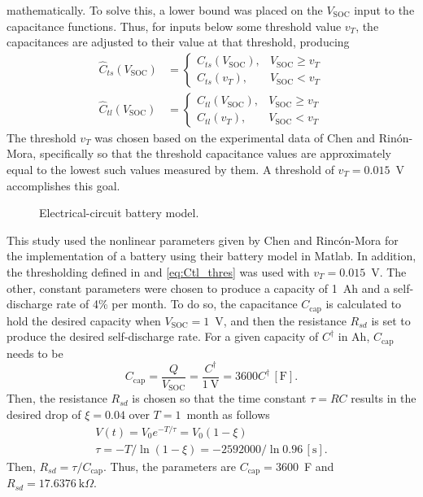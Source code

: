 \documentclass[../zhang_thesis.tex]{subfiles}
\begin{document}
mathematically. To solve this, a lower bound was placed on the $V_\text{SOC}$ input to the capacitance functions. Thus, for inputs below some threshold value $v_T$, the capacitances are adjusted to their value at that threshold, producing
\begin{align}
    \hat{C}_{ts}(V_\text{SOC}) &= \begin{cases}
        C_{ts}(V_\text{SOC}), & V_\text{SOC} \ge v_T \\
        C_{ts}(v_T), & V_\text{SOC} < v_T
        \end{cases} \label{eq:Cts_thres} \\
    \hat{C}_{tl}(V_\text{SOC}) &= \begin{cases}
        C_{tl}(V_\text{SOC}), & V_\text{SOC} \ge v_T \\
        C_{tl}(v_T), & V_\text{SOC} < v_T \label{eq:Ctl_thres}
        \end{cases}
\end{align}
The threshold $v_T$ was chosen based on the experimental data of Chen and Rin\'on-Mora, specifically so that the threshold capacitance values are approximately equal to the lowest such values measured by them. A threshold of $v_T=0.015$~V accomplishes this goal.

\begin{figure}[ht]

\caption{Electrical-circuit battery model.}
\label{fig:batt_model}
\end{figure}

This study used the nonlinear parameters given by Chen and Rinc\'on-Mora for the implementation of a battery using their battery model in Matlab. In addition, the thresholding defined in  and \ref{eq:Ctl_thres} was used with $v_T=0.015$~V. The other, constant parameters were chosen to produce a capacity of 1~Ah and a self-discharge rate of 4\% per month. To do so, the capacitance $C_\text{cap}$ is calculated to hold the desired capacity
when $V_\text{SOC}=1$~V, and then the resistance $R_{sd}$ is set to produce the desired self-discharge rate. For a given capacity of $C^\dag$ in Ah, $C_\text{cap}$ needs to be
\begin{equation}
    C_\text{cap} = \frac{Q}{V_\text{SOC}} = \frac{C^\dag}{1~\text{V}} = 3600 C^\dag \,[\text{F}].
\end{equation}
Then, the resistance $R_{sd}$ is chosen so that the time constant $\tau=RC$ results in the desired drop of $\xi=0.04$ over $T=1$~month as follows
\begin{gather}
    V(t) = V_0 e^{-T/\tau} = V_0 (1-\xi) \\
    \tau = -T/\ln(1-\xi) = -2592000/\ln 0.96 \,[\text{s}].
\end{gather}
Then, $R_{sd}=\tau/C_\text{cap}$. Thus, the parameters are $C_\text{cap}=3600$~F and $R_{sd}=17.6376~\mathrm{k}\Omega$.
\end{document}
